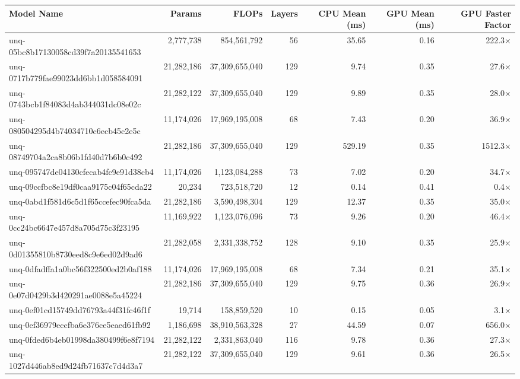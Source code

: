 \begin{table}[h!]
\centering
\fontsize{7}{9}\selectfont
\begin{tabular}{lrrrrrr}
\toprule
\textbf{Model Name} & \textbf{Params} & \textbf{FLOPs} & \textbf{Layers} & \textbf{CPU Mean (ms)} & \textbf{GPU Mean (ms)} & \textbf{GPU Faster Factor} \\
\midrule
unq-05bc8b17130058cd39f7a20135541653 & 2,777,738 & 854,561,792 & 56 & 35.65 & 0.16 & 222.3$\times$ \\
unq-0717b779fae99023dd6bb1d058584091 & 21,282,186 & 37,309,655,040 & 129 & 9.74 & 0.35 & 27.6$\times$ \\
unq-0743bcb1f84083d4ab344031dc08e02c & 21,282,122 & 37,309,655,040 & 129 & 9.89 & 0.35 & 28.0$\times$ \\
unq-080504295d4b74034710c6ecb45c2e5c & 11,174,026 & 17,969,195,008 & 68 & 7.43 & 0.20 & 36.9$\times$ \\
unq-08749704a2ca8b06b1fd40d7b6b0c492 & 21,282,186 & 37,309,655,040 & 129 & 529.19 & 0.35 & 1512.3$\times$ \\
unq-095747de04130cfecab4fc9e91d38cb4 & 11,174,026 & 1,123,084,288 & 73 & 7.02 & 0.20 & 34.7$\times$ \\
unq-09ccfbc8e19df0caa9175c04f65cda22 & 20,234 & 723,518,720 & 12 & 0.14 & 0.41 & 0.4$\times$ \\
unq-0abd1f581d6c5d1f65ccefec90fca5da & 21,282,186 & 3,590,498,304 & 129 & 12.37 & 0.35 & 35.0$\times$ \\
unq-0cc24bc6647e457d8a705d75c3f23195 & 11,169,922 & 1,123,076,096 & 73 & 9.26 & 0.20 & 46.4$\times$ \\
unq-0d01355810b8730eed8c9e6ed02d9ad6 & 21,282,058 & 2,331,338,752 & 128 & 9.10 & 0.35 & 25.9$\times$ \\
unq-0dfadffa1a0bc56f322500ed2b0af188 & 11,174,026 & 17,969,195,008 & 68 & 7.34 & 0.21 & 35.1$\times$ \\
unq-0e07d0429b3d420291ae0088e5a45224 & 21,282,186 & 37,309,655,040 & 129 & 9.75 & 0.36 & 26.9$\times$ \\
unq-0ef01cd15749dd76793a44f31fc46f1f & 19,714 & 158,859,520 & 10 & 0.15 & 0.05 & 3.1$\times$ \\
unq-0ef36979eccfba6e376ce5eaed61fb92 & 1,186,698 & 38,910,563,328 & 27 & 44.59 & 0.07 & 656.0$\times$ \\
unq-0fded6b4eb01998da380499f6e8f7194 & 21,282,122 & 2,331,863,040 & 116 & 9.78 & 0.36 & 27.3$\times$ \\
unq-1027d446ab8ed9d24fb71637c7d4d3a7 & 21,282,122 & 37,309,655,040 & 129 & 9.61 & 0.36 & 26.5$\times$ \\

\end{tabular}
\end{table}
